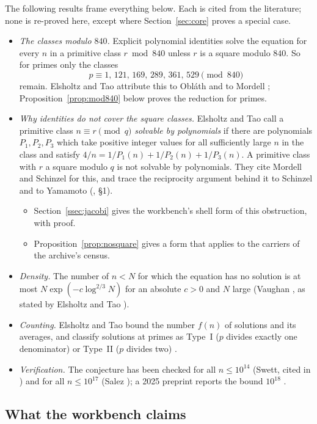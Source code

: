 The following results frame everything below. Each is cited from the literature; none is re-proved here, except where Section~\ref{sec:core} proves a special case.
\begin{itemize}
\item \emph{The classes modulo $840$.} Explicit polynomial identities solve the equation for every $n$ in a primitive class $r\bmod 840$ unless $r$ is a square modulo $840$. So for primes only the classes
\[
p\equiv1,\,121,\,169,\,289,\,361,\,529\pmod{840}
\]
remain. Elsholtz and Tao attribute this to Obláth and to Mordell \cite{ElsholtzTao,Mordell}; Proposition~\ref{prop:mod840} below proves the reduction for primes.
\item \emph{Why identities do not cover the square classes.} Elsholtz and Tao \cite{ElsholtzTao} call a primitive class $n\equiv r\pmod q$ \emph{solvable by polynomials} if there are polynomials $P_1,P_2,P_3$ which take positive integer values for all sufficiently large $n$ in the class and satisfy $4/n=1/P_1(n)+1/P_2(n)+1/P_3(n)$. A primitive class with $r$ a square modulo $q$ is not solvable by polynomials. They cite Mordell and Schinzel for this, and trace the reciprocity argument behind it to Schinzel and to Yamamoto (\cite{ElsholtzTao}, §1).
\begin{itemize}
\item Section~\ref{ssec:jacobi} gives the workbench's shell form of this obstruction, with proof.
\item Proposition~\ref{prop:nosquare} gives a form that applies to the carriers of the archive's census.
\end{itemize}
\item \emph{Density.} The number of $n<N$ for which the equation has no solution is at most $N\exp(-c\log^{2/3}N)$ for an absolute $c>0$ and $N$ large (Vaughan \cite{Vaughan}, as stated by Elsholtz and Tao \cite{ElsholtzTao}).
\item \emph{Counting.} Elsholtz and Tao bound the number $f(n)$ of solutions and its averages, and classify solutions at primes as Type~I ($p$ divides exactly one denominator) or Type~II ($p$ divides two) \cite{ElsholtzTao}.
\item \emph{Verification.} The conjecture has been checked for all $n\le10^{14}$ (Swett, cited in \cite{ElsholtzTao}) and for all $n\le10^{17}$ (Salez \cite{Salez}); a 2025 preprint reports the bound $10^{18}$ \cite{MihneaDumitru}.
\end{itemize}

\subsection{What the workbench claims}


